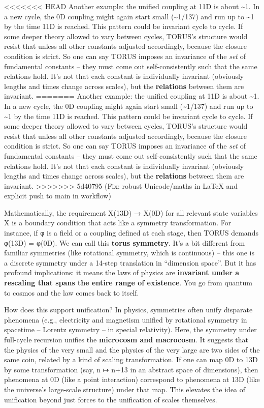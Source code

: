 \documentclass[]{article}
\begin{document}
<<<<<<< HEAD
Another example: the unified coupling at 11D is about \textasciitilde1.
In a new cycle, the 0D coupling might again start small
(\textasciitilde1/137) and run up to \textasciitilde1 by the time 11D is
reached. This pattern could be invariant cycle to cycle. If some deeper
theory allowed \alpha to vary between cycles, TORUS's structure would resist
that unless all other constants adjusted accordingly, because the
closure condition is strict. So one can say TORUS imposes an invariance
of the \emph{set} of fundamental constants -- they must come out
self-consistently such that the same relations hold. It's not that each
constant is individually invariant (obviously lengths and times change
across scales), but the \textbf{relations} between them are invariant.
=======
Another example: the unified coupling at 11D is about
\textasciitilde{}1. In a new cycle, the 0D coupling might again start
small (\textasciitilde{}1/137) and run up to \textasciitilde{}1 by the
time 11D is reached. This pattern could be invariant cycle to cycle. If
some deeper theory allowed \alpha to vary between cycles, TORUS's structure
would resist that unless all other constants adjusted accordingly,
because the closure condition is strict. So one can say TORUS imposes an
invariance of the \emph{set} of fundamental constants -- they must come
out self-consistently such that the same relations hold. It's not that
each constant is individually invariant (obviously lengths and times
change across scales), but the \textbf{relations} between them are
invariant.
>>>>>>> 5d40795 (Fix: robust Unicode/maths in LaTeX and explicit push to main in workflow)

Mathematically, the requirement X(13D) → X(0D) for all relevant state
variables X is a boundary condition that acts like a symmetry
transformation​. For instance, if φ is a field or a coupling defined at
each stage, then TORUS demands φ(13D) = φ(0D). We can call this
\textbf{torus symmetry}. It's a bit different from familiar symmetries
(like rotational symmetry, which is continuous) -- this one is a
discrete symmetry under a 14-step translation in ``dimension space''.
But it has profound implications: it means the laws of physics are
\textbf{invariant under a rescaling that spans the entire range of
existence}. You go from quantum to cosmos and the law comes back to
itself.

How does this support unification? In physics, symmetries often unify
disparate phenomena (e.g., electricity and magnetism unified by
rotational symmetry in spacetime -- Lorentz symmetry -- in special
relativity). Here, the symmetry under full-cycle recursion unifies the
\textbf{microcosm and macrocosm}. It suggests that the physics of the
very small and the physics of the very large are two sides of the same
coin, related by a kind of scaling transformation. If one can map 0D to
13D by some transformation (say, n ↦ n+13 in an abstract space of
dimensions), then phenomena at 0D (like a point interaction) correspond
to phenomena at 13D (like the universe's large-scale structure) under
that map. This elevates the idea of unification beyond just forces to
the unification of scales themselves.
\end{document}
